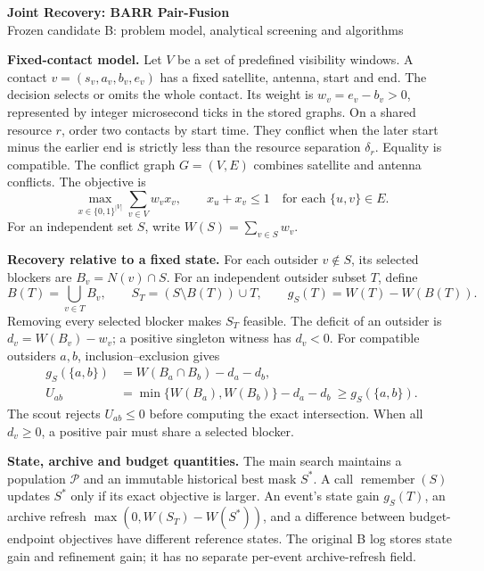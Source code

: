 \documentclass[10pt,a4paper]{article}
\newcommand{\Pop}{\mathcal P}
\newcommand{\Remember}{\operatorname{remember}}
\begin{document}
\begin{center}
{\Large\bfseries Joint Recovery: BARR Pair-Fusion}\\[3pt]
{\small Frozen candidate B: problem model, analytical screening and algorithms}
\end{center}

\textbf{Fixed-contact model.}
Let $V$ be a set of predefined visibility windows. A contact
$v=(s_v,a_v,b_v,e_v)$ has a fixed satellite, antenna, start and end.
The decision selects or omits the whole contact. Its weight is
$w_v=e_v-b_v>0$, represented by integer microsecond ticks in the stored graphs.
On a shared resource $r$, order two contacts by start time. They conflict
when the later start minus the earlier end is strictly less than the
resource separation $\delta_r$. Equality is compatible. The conflict graph
$G=(V,E)$ combines satellite and antenna conflicts. The objective is
\begin{equation}
\max_{x\in\{0,1\}^{|V|}}\sum_{v\in V}w_vx_v,
\qquad x_u+x_v\leq1\quad\text{for each }\{u,v\}\in E.
\end{equation}
For an independent set $S$, write $W(S)=\sum_{v\in S}w_v$.

\textbf{Recovery relative to a fixed state.}
For each outsider $v\notin S$, its selected blockers are
$B_v=N(v)\cap S$. For an independent outsider subset $T$, define
\begin{equation}
B(T)=\bigcup_{v\in T}B_v,\qquad
S_T=(S\setminus B(T))\cup T,\qquad
g_S(T)=W(T)-W(B(T)).
\end{equation}
Removing every selected blocker makes $S_T$ feasible. The deficit of an
outsider is $d_v=W(B_v)-w_v$; a positive singleton witness has $d_v<0$.
For compatible outsiders $a,b$, inclusion--exclusion gives
\begin{align}
g_S(\{a,b\})&=W(B_a\cap B_b)-d_a-d_b,\\
U_{ab}&=\min\{W(B_a),W(B_b)\}-d_a-d_b\ \geq g_S(\{a,b\}).
\end{align}
The scout rejects $U_{ab}\leq0$ before computing the exact intersection.
When all $d_v\geq0$, a positive pair must share a selected blocker.

\textbf{State, archive and budget quantities.}
The main search maintains a population $\Pop$ and an immutable historical
best mask $S^*$. A call $\Remember(S)$ updates $S^*$ only if its exact
objective is larger. An event's state gain $g_S(T)$, an archive refresh
$\max(0,W(S_T)-W(S^*))$, and a difference between budget-endpoint
objectives have different reference states. The original B log stores
state gain and refinement gain; it has no separate per-event archive-refresh field.
\end{document}
